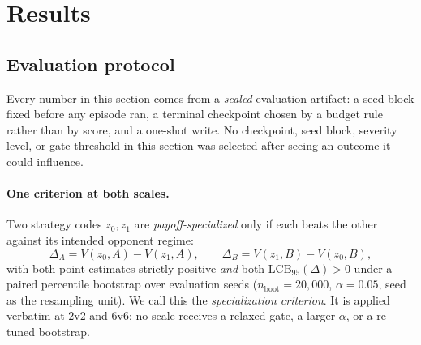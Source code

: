 \section{Results}
\label{sec:results}
%
%
%

\subsection{Evaluation protocol}
\label{sec:results-protocol}

Every number in this section comes from a \emph{sealed} evaluation artifact:
a seed block fixed before any episode ran, a terminal checkpoint chosen by a
budget rule rather than by score, and a one-shot write. No checkpoint, seed
block, severity level, or gate threshold in this section was selected after
seeing an outcome it could influence.

\paragraph{One criterion at both scales.}
Two strategy codes $z_0,z_1$ are \emph{payoff-specialized} only if each beats the
other against its intended opponent regime:
\[
\Delta_A=V(z_0,A)-V(z_1,A),
\qquad
\Delta_B=V(z_1,B)-V(z_0,B),
\]
with both point estimates strictly positive \emph{and} both
$\mathrm{LCB}_{95}(\Delta)>0$ under a paired percentile bootstrap over
evaluation seeds ($n_{\mathrm{boot}}=20{,}000$, $\alpha=0.05$, seed as the
resampling unit). We call this the \emph{specialization criterion}. It is applied
verbatim at $2$v$2$ and $6$v$6$; no scale receives a relaxed gate, a larger
$\alpha$, or a re-tuned bootstrap.

